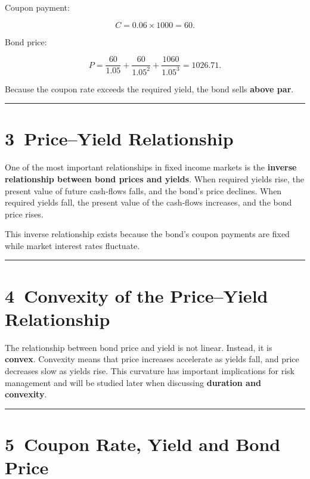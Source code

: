 \documentclass[
  letterpaper,
  DIV=11,
  numbers=noendperiod]{scrartcl}
\begin{document}
Coupon payment:

\[
C = 0.06 \times 1000 = 60.
\]

Bond price:

\[
P = \frac{60}{1.05} + \frac{60}{1.05^2} + \frac{1060}{1.05^3} = 1026.71.
\]

Because the coupon rate exceeds the required yield, the bond sells
\textbf{above par}.

\begin{center}\rule{0.5\linewidth}{0.5pt}\end{center}

\section{3~Price--Yield Relationship}\label{priceyield-relationship}

One of the most important relationships in fixed income markets is the
\textbf{inverse relationship between bond prices and yields}. When
required yields rise, the present value of future cash‑flows falls, and
the bond's price declines. When required yields fall, the present value
of the cash‑flows increases, and the bond price rises.

This inverse relationship exists because the bond's coupon payments are
fixed while market interest rates fluctuate.

\begin{center}\rule{0.5\linewidth}{0.5pt}\end{center}

\section{4~Convexity of the Price--Yield
Relationship}\label{convexity-of-the-priceyield-relationship}

The relationship between bond price and yield is not linear. Instead, it
is \textbf{convex}. Convexity means that price increases accelerate as
yields fall, and price decreases slow as yields rise. This curvature has
important implications for risk management and will be studied later
when discussing \textbf{duration and convexity}.

\begin{center}\rule{0.5\linewidth}{0.5pt}\end{center}

\section{5~Coupon Rate, Yield and Bond
Price}\label{coupon-rate-yield-and-bond-price}
\end{document}
